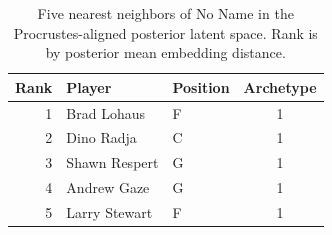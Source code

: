 \begin{table}[htbp]
  \centering\small
  \begin{tabular}{rllc}
    \toprule
    Rank & Player & Position & Archetype \\
    \midrule
    1 & Brad Lohaus & F & 1 \\
    2 & Dino Radja & C & 1 \\
    3 & Shawn Respert & G & 1 \\
    4 & Andrew Gaze & G & 1 \\
    5 & Larry Stewart & F & 1 \\
    \bottomrule
  \end{tabular}
  \caption{Five nearest neighbors of No Name in the Procrustes-aligned posterior latent space. Rank is by posterior mean embedding distance.}
  \label{tab:No_Name_neighbors}
\end{table}

